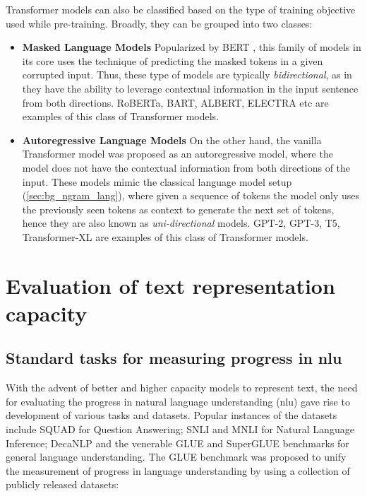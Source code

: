 \documentclass[letterpaper, 12pt]{report}
\begin{document}
Transformer models can also be classified based on the type of training objective used while pre-training. Broadly, they can be grouped into two classes:

\begin{itemize}
  \item \textbf{Masked Language Models} Popularized by BERT \citep{devlin2018bert}, this family of models in its core uses the technique of predicting the masked tokens in a given corrupted input. Thus, these type of models are typically \textit{bidirectional}, as in they have the ability to leverage contextual information in the input sentence from both directions. RoBERTa, BART, ALBERT, ELECTRA etc are examples of this class of Transformer models.
  \item \textbf{Autoregressive Language Models} On the other hand, the vanilla Transformer model was proposed as an autoregressive model, where the model does not have the contextual information from both directions of the input. These models mimic the classical language model setup (\autoref{sec:bg_ngram_lang}), where given a sequence of tokens the model only uses the previously seen tokens as context to generate the next set of tokens, hence they are also known as \textit{uni-directional} models. GPT-2, GPT-3, T5, Transformer-XL are examples of this class of Transformer models.
\end{itemize}

\section{Evaluation of text representation capacity}

\subsection{Standard tasks for measuring progress in \acrshort{nlu}}

With the advent of better and higher capacity models to represent text, the need for evaluating the progress in natural language understanding (\acrshort{nlu}) gave rise to development of various tasks and datasets. Popular instances of the datasets include SQUAD \citep{rajpurkar-etal-2016-squad} for Question Answering; SNLI \citep{bowman-etal-2015-large} and MNLI \citep{williams-etal-2018-broad} for Natural Language Inference; DecaNLP \citep{mccann2018natural} and the venerable GLUE \citep{wang-etal-2018-glue} and SuperGLUE \citep{wang-etal-2019-superglue} benchmarks for general language understanding. The GLUE benchmark was proposed to unify the measurement of progress in language understanding by using a collection of publicly released datasets:
\end{document}
